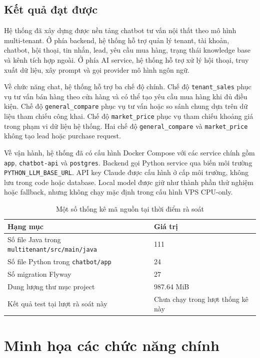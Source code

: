 \documentclass[../DoAn.tex]{subfiles}
\begin{document}
\subsection{Kết quả đạt được}

Hệ thống đã xây dựng được nền tảng chatbot tư vấn nội thất theo mô hình multi-tenant. Ở phía backend, hệ thống hỗ trợ quản lý tenant, tài khoản, chatbot, hội thoại, tin nhắn, lead, yêu cầu mua hàng, trạng thái knowledge base và kênh tích hợp ngoài. Ở phía AI service, hệ thống hỗ trợ xử lý hội thoại, truy xuất dữ liệu, xây prompt và gọi provider mô hình ngôn ngữ.

Về chức năng chat, hệ thống hỗ trợ ba chế độ chính. Chế độ \texttt{tenant\_sales} phục vụ tư vấn bán hàng theo cửa hàng và có thể tạo yêu cầu mua hàng khi đủ điều kiện. Chế độ \texttt{general\_compare} phục vụ tư vấn hoặc so sánh chung dựa trên dữ liệu tham chiếu công khai. Chế độ \texttt{market\_price} phục vụ tham chiếu khoảng giá trong phạm vi dữ liệu hệ thống. Hai chế độ \texttt{general\_compare} và \texttt{market\_price} không tạo lead hoặc purchase request.

Về vận hành, hệ thống đã có cấu hình Docker Compose với các service chính gồm \texttt{app}, \texttt{chatbot-api} và \texttt{postgres}. Backend gọi Python service qua biến môi trường \texttt{PYTHON\_LLM\_BASE\_URL}. API key Claude được cấu hình ở cấp môi trường, không lưu trong code hoặc database. Local model được giữ như thành phần thử nghiệm hoặc fallback, nhưng không chạy mặc định trong cấu hình VPS CPU-only.

\begin{table}[H]
\centering
\caption{Một số thống kê mã nguồn tại thời điểm rà soát}
\label{tab:ch4-source-stats}
\begin{tabular}{|p{}|p{}|}
\hline
\textbf{Hạng mục} & \textbf{Giá trị} \\
\hline
Số file Java trong \texttt{multitenant/src/main/java} & 111 \\
\hline
Số file Python trong \texttt{chatbot/app} & 24 \\
\hline
Số migration Flyway & 27 \\
\hline
Dung lượng thư mục project & 987.64 MiB \\
\hline
Kết quả test tại lượt rà soát này & Chưa chạy trong lượt thống kê này \\
\hline
\end{tabular}
\end{table}

\section{Minh họa các chức năng chính}
\end{document}
